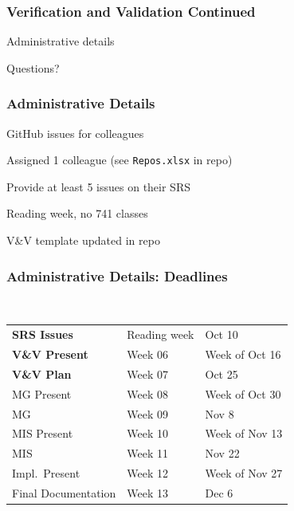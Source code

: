 \documentclass[t,12pt,numbers,fleqn]{beamer}
\begin{document}



\begin{frame}
\frametitle{Verification and Validation Continued}

\bi
\item Administrative details
\item Questions?
\ei
\end{frame}


\begin{frame}
\frametitle{Administrative Details}

\bi
\item GitHub issues for colleagues
\bi
\item Assigned 1 colleague (see \texttt{Repos.xlsx} in repo)
\item Provide at least 5 issues on their SRS
\ei
\item Reading week, no 741 classes
\item V\&V template updated in repo
\ei

\end{frame}


\begin{frame}
\frametitle{Administrative Details: Deadlines}
~\newline
\begin{tabular}{l l l}
\textbf{SRS Issues} & Reading week & Oct 10\\
\textbf{V\&V Present} & Week 06 & Week of Oct 16\\
\textbf{V\&V Plan} & Week 07 & Oct 25\\
MG Present & Week 08 & Week of Oct 30\\
MG & Week 09 & Nov 8\\
MIS Present & Week 10 & Week of Nov 13\\
MIS & Week 11 & Nov 22\\
Impl.\ Present & Week 12 & Week of Nov 27\\
Final Documentation & Week 13 & Dec 6\\
\end {tabular}

\end{frame}

\end{document}
